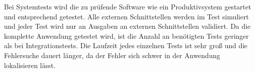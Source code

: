Bei Systemtests wird die zu prüfende Software wie ein Produktivsystem
gestartet und entsprechend getestet. 
Alle externen Schnittstellen werden im Test simuliert und jeder Test wird nur an Ausgaben an externen Schnittstellen validiert.
Da die komplette Anwendung getestet wird, ist die Anzahl an benötigten Tests geringer als bei Integrationstests. 
Die Laufzeit jedes einzelnen Tests ist sehr groß 
und die Fehlersuche dauert länger, da der Fehler sich schwer in der Anwendung lokalisieren lässt.
